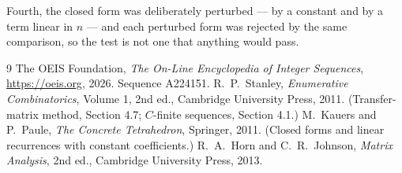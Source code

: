 \documentclass[11pt,a4paper]{article}
\theoremstyle{plain}
\theoremstyle{definition}
\begin{document}
Fourth, the closed form was deliberately perturbed --- by a constant and by a term linear in
$n$ --- and each perturbed form was rejected by the same comparison, so the test is not one
that anything would pass.

\begin{thebibliography}{9}
 The OEIS Foundation, \emph{The On-Line Encyclopedia of Integer
Sequences}, \url{https://oeis.org}, 2026. Sequence A224151.
 R.~P.~Stanley, \emph{Enumerative Combinatorics}, Volume 1, 2nd ed.,
Cambridge University Press, 2011. (Transfer-matrix method, Section 4.7; $C$-finite sequences,
Section 4.1.)
 M.~Kauers and P.~Paule, \emph{The Concrete Tetrahedron}, Springer, 2011.
(Closed forms and linear recurrences with constant coefficients.)
 R.~A.~Horn and C.~R.~Johnson, \emph{Matrix Analysis}, 2nd ed., Cambridge
University Press, 2013.
\end{thebibliography}
\end{document}
